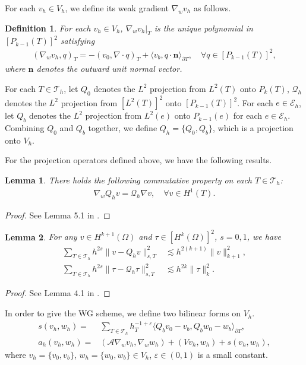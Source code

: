\documentclass[10pt,a4paper]{amsart}
\numberwithin{equation}{section}
\newtheorem{lemma}{Lemma}[section]
\newtheorem{defi}{Definition}[section]
\newcommand{\E}{\mathcal{E}}
\newcommand{\T}{{\mathcal{T}}}
\newcommand{\Q}{{\mathcal{Q}}}
\newcommand{\sumT}{\sum_{T\in\mathcal{T}_h}}     %
\newcommand{\bn}{\mathbf{n}}
\newcommand{\eps}{\varepsilon}
\newcommand{\A}{\mathcal{A}}
\newcommand{\la}{\langle}
\newcommand{\ra}{\rangle_{\partial T}}
\begin{document}
	For each $ v_h\in V_h$, we define its weak gradient $\nabla_w v_h$ as follows.
	\begin{defi}
		For each $ v_h\in V_h$, $\nabla_w v_h|_T$ is the unique polynomial in $[P_{k-1}(T)]^{2}$
		satisfying
		\begin{eqnarray*}
			(\nabla_w v_h,q)_T=-(v_0,\nabla\cdot q)_T+\la v_b,q\cdot\bn
			\ra,\quad\forall q\in [P_{k-1}(T)]^2,
		\end{eqnarray*}
		where $\bn$ denotes the outward unit normal vector.
	\end{defi}
	
	For each $T\in\T_h$, let $Q_0$ denotes the $L^2$ projection from $L^2(T)$ onto $ P_k(T)$, $\Q_h$ denotes the $L^2$ projection from $[L^2(T)]^{2}$ onto $[P_{k-1}(T)]^{2}$.
	For each $e\in\E_h$, let $Q_b$ denotes the $L^2$ projection from $L^2(e)$ onto $ P_{k-1}(e)$ for each $e\in\E_h$.
	Combining $Q_0$ and $Q_b$ together, we define $Q_h=\{Q_0,Q_b\}$,
	which is a projection onto $V_h$.
	
	For the projection operators defined above, we have the following results.
	\begin{lemma}\label{lem3}
		There holds the following commutative property on each $T\in\T_h$:
		\begin{eqnarray*}
			\nabla_wQ_hv=\Q_h\nabla v, \quad\forall v\in H^1(T).
		\end{eqnarray*}
	\end{lemma}
	\begin{proof}
		See Lemma 5.1 in \cite{Mu2013c}.
	\end{proof}
	
	\begin{lemma}
		For any $v\in H^{k+1}(\Omega)$ and $\tau\in [H^k(\Omega)]^2$, $s=0,1$, we have
		\begin{eqnarray}
			\sumT h^{2s}\|v-Q_hv\|_{s,T}^2&\lesssim h^{2(k+1)}\|v\|_{k+1}^2,\label{pro1}\\
			\sumT h^{2s}\|\tau-\Q_h\tau\|_{s,T}^2&\lesssim h^{2k}\|\tau\|_k^2.\label{pro2}
		\end{eqnarray}
	\end{lemma}
	\begin{proof}
		See Lemma 4.1 in \cite{Wang2014a}.
	\end{proof}
	
	In order to give the WG scheme, we define two bilinear forms on $V_h$.
	\begin{eqnarray}
		s( v_h, w_h)=&\sumT h_T^{-1+\eps}\langle  Q_bv_0- v_b, Q_bw_0- w_b\rangle_{\partial T},\label{2.1}\\
		a_h( v_h, w_h)=&(\A\nabla_wv_h,\nabla_ww_h)+(Vv_h,w_h)+s(v_h,w_h),\label{2.2}
	\end{eqnarray}
	where $v_h=\{v_0,v_b\}$, $w_h=\{w_0,w_b\}\in V_h$, $\eps\in(0,1)$ is a small constant.
	
\end{document}
